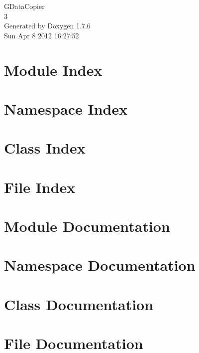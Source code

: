 \documentclass[a4paper]{book}
\begin{document}
\hypersetup{pageanchor=false,citecolor=blue}
\begin{titlepage}
\vspace*{7cm}
\begin{center}
{\Large \-G\-Data\-Copier \\[1ex]\large 3 }\\
\vspace*{1cm}
{\large \-Generated by Doxygen 1.7.6}\\
\vspace*{0.5cm}
{\small Sun Apr 8 2012 16:27:52}\\
\end{center}
\end{titlepage}
\clearemptydoublepage
{}
\tableofcontents
\clearemptydoublepage
{}
\hypersetup{pageanchor=true,citecolor=blue}
\chapter{\-Module \-Index}

\chapter{\-Namespace \-Index}

\chapter{\-Class \-Index}

\chapter{\-File \-Index}

\chapter{\-Module \-Documentation}

\chapter{\-Namespace \-Documentation}



\chapter{\-Class \-Documentation}







\chapter{\-File \-Documentation}



\printindex
\end{document}
